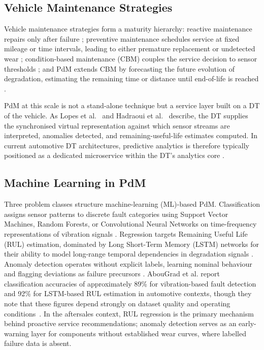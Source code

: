 \documentclass[conference,a4paper]{IEEEtran}
\begin{document}

\subsection{Vehicle Maintenance Strategies}

Vehicle maintenance strategies form a maturity hierarchy: reactive maintenance repairs only after failure \cite{abougrad2026xai}; preventive maintenance schedules service at fixed mileage or time intervals, leading to either premature replacement or undetected wear \cite{abougrad2026xai,aichi2024multilayered}; condition-based maintenance (CBM) couples the service decision to sensor thresholds \cite{aichi2024multilayered}; and PdM extends CBM by forecasting the future evolution of degradation, estimating the remaining time or distance until end-of-life is reached \cite{kumar2025suspension,abougrad2026xai}.

PdM at this scale is not a stand-alone technique but a service layer built on a DT of the vehicle. As Lopes et al.~\cite{lopes2025vehicledt} and Hadraoui et al.~\cite{aichi2024multilayered} describe, the DT supplies the synchronised virtual representation against which sensor streams are interpreted, anomalies detected, and remaining-useful-life estimates computed. In current automotive DT architectures, predictive analytics is therefore typically positioned as a dedicated microservice within the DT's analytics core \cite{lopes2025vehicledt,karthick2025simulating,abougrad2026xai}.

\subsection{Machine Learning in PdM}

Three problem classes structure machine-learning (ML)-based PdM. Classification assigns sensor patterns to discrete fault categories using Support Vector Machines, Random Forests, or Convolutional Neural Networks on time-frequency representations of vibration signals \cite{kumar2025suspension,abougrad2026xai}. Regression targets Remaining Useful Life (RUL) estimation, dominated by Long Short-Term Memory (LSTM) networks for their ability to model long-range temporal dependencies in degradation signals \cite{karthick2025simulating,abougrad2026xai}. Anomaly detection operates without explicit labels, learning nominal behaviour and flagging deviations as failure precursors \cite{karthick2025simulating,abougrad2026xai}. AbouGrad et al. report classification accuracies of approximately 89\% for vibration-based fault detection and 92\% for LSTM-based RUL estimation in automotive contexts, though they note that these figures depend strongly on dataset quality and operating conditions~\cite{abougrad2026xai}. In the aftersales context, RUL regression is the primary mechanism behind proactive service recommendations; anomaly detection serves as an early-warning layer for components without established wear curves, where labelled failure data is absent.
\end{document}
